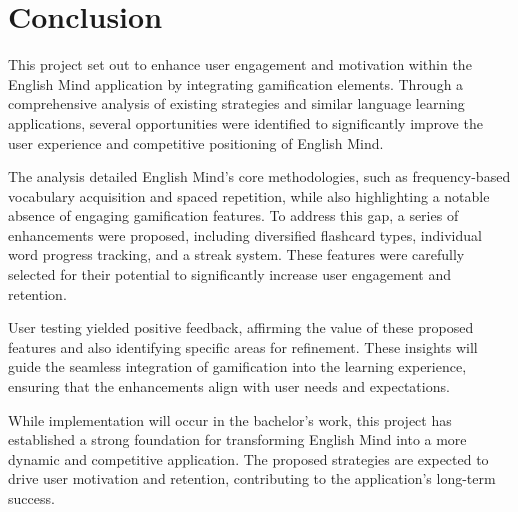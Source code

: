 \chapter{Conclusion}

This project set out to enhance user engagement and motivation within the English Mind application by integrating gamification elements. Through a comprehensive analysis of existing strategies and similar language learning applications, several opportunities were identified to significantly improve the user experience and competitive positioning of English Mind.

The analysis detailed English Mind's core methodologies, such as frequency-based vocabulary acquisition and spaced repetition, while also highlighting a notable absence of engaging gamification features. To address this gap, a series of enhancements were proposed, including diversified flashcard types, individual word progress tracking, and a streak system. These features were carefully selected for their potential to significantly increase user engagement and retention.

User testing yielded positive feedback, affirming the value of these proposed features and also identifying specific areas for refinement. These insights will guide the seamless integration of gamification into the learning experience, ensuring that the enhancements align with user needs and expectations.

While implementation will occur in the bachelor's work, this project has established a strong foundation for transforming English Mind into a more dynamic and competitive application. The proposed strategies are expected to drive user motivation and retention, contributing to the application's long-term success.